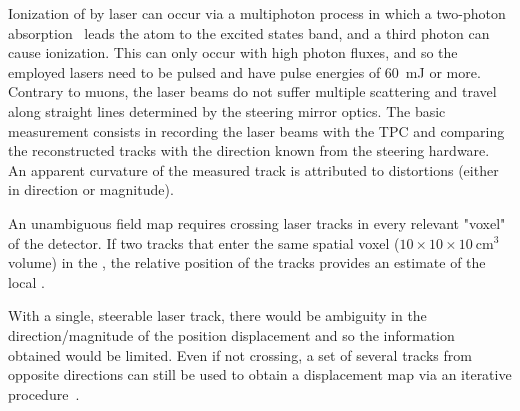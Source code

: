 Ionization of  by laser can occur via a multiphoton process in which a two-photon absorption~\cite{badhrees2010} leads the atom to the excited states band, and a third photon can cause ionization. This can only occur with high photon fluxes, and so the employed lasers need to be pulsed and have pulse energies of \num{60}~mJ or more. Contrary to muons, the laser beams do not suffer multiple scattering and travel along straight lines determined by the steering mirror optics. The basic measurement consists in recording the laser beams with the TPC and comparing the reconstructed tracks with the direction known from the steering hardware. An apparent curvature of the measured track is attributed to \efield distortions (either in direction or magnitude).

An unambiguous field map requires crossing laser tracks in every relevant "voxel" of the detector. If two tracks that enter the same spatial voxel ($10 \times 10 \times 10 ~\textrm{cm}^3$ volume) in the , the relative position of the tracks provides an estimate of the local \threed \efield.

With a single, steerable laser track, there would be ambiguity in the direction/magnitude of the position displacement and so the information obtained would be limited. Even if not crossing, a set of several tracks from opposite directions can still be used to obtain a displacement map via an iterative procedure~\cite{chen2018}.

 



